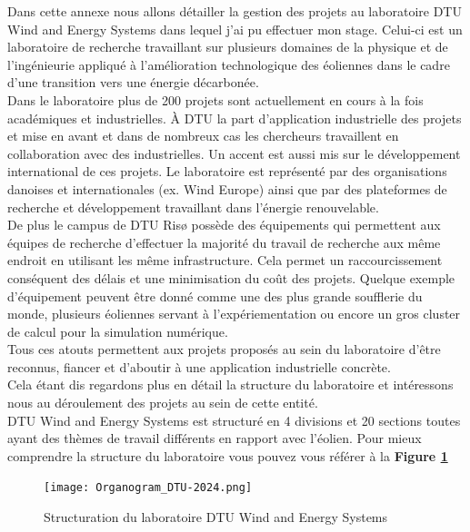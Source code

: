 \documentclass[12pt]{article}   %
\theoremstyle{plain}
\theoremstyle{remark}
\begin{document}
Dans cette annexe nous allons détailler la gestion des projets au laboratoire DTU Wind and Energy Systems dans lequel j'ai pu effectuer mon stage. Celui-ci est un laboratoire de recherche travaillant sur plusieurs domaines de la physique et de l'ingénieurie appliqué à l'amélioration technologique des éoliennes dans le cadre d'une transition vers une énergie décarbonée. \\

Dans le laboratoire plus de 200 projets sont actuellement en cours à la fois académiques et industrielles. À DTU la part d'application industrielle des projets et mise en avant et dans de nombreux cas les chercheurs travaillent en collaboration avec des industrielles. Un accent est aussi mis sur le développement international de ces projets. Le laboratoire est représenté par des organisations danoises et internationales (ex. Wind Europe) ainsi que par des plateformes de recherche et développement travaillant dans l'énergie renouvelable. \\
De plus le campus de DTU Risø possède des équipements qui permettent aux équipes de recherche d'effectuer la majorité du travail de recherche aux même endroit en utilisant les même infrastructure. Cela permet un raccourcissement conséquent des délais et une minimisation du coût des projets. Quelque exemple d'équipement peuvent être donné comme une des plus grande soufflerie du monde, plusieurs éoliennes servant à l'expériementation ou encore un gros cluster de calcul pour la simulation numérique.\\ Tous ces atouts permettent aux projets proposés au sein du laboratoire d'être reconnus, fiancer et d'aboutir à une application industrielle concrète. \\

Cela étant dis regardons plus en détail la structure du laboratoire et intéressons nous au déroulement des projets au sein de cette entité. \\
DTU Wind and Energy Systems est structuré en 4 divisions et 20 sections toutes ayant des thèmes de travail différents en rapport avec l'éolien. Pour mieux comprendre la structure du laboratoire vous pouvez vous référer à la \textbf{Figure \ref{fig:organigrame}}

\begin{figure}[H]
	\begin{center}
		\texttt{[image: Organogram\_DTU-2024.png]}
		\caption{Structuration du laboratoire DTU Wind and Energy Systems}
		\label{fig:organigrame}
	\end{center}
\end{figure}
\end{document}
